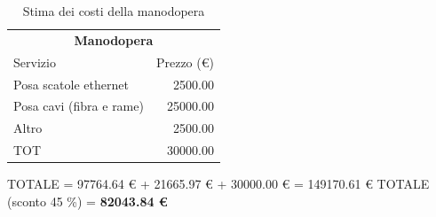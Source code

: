 \documentclass[11pt, a4paper, oneside]{article}
\begin{document}
		\begin{table}[H]
			\begin{tabular}{lr}
				\hline
				\multicolumn{2}{c}{\textbf{Manodopera}} \\
				\cline{1-2}
				Servizio & Prezzo (\euro{}) \\ \hline
				Posa scatole ethernet & 2500.00 \\
				Posa cavi (fibra e rame) & 25000.00 \\
				Altro & 2500.00 \\
				TOT & 30000.00 \\
				\hline
			\end{tabular}
			\caption[Costo manodopera]{Stima dei costi della manodopera}
		\end{table}
		
		\par		
		TOTALE =  97764.64 \euro{} + 21665.97 \euro{} + 30000.00 \euro{} = 149170.61 \euro{}\newline
		TOTALE (sconto 45 \%) = \textbf{82043.84 \euro{}}
		
	
\end{document}
